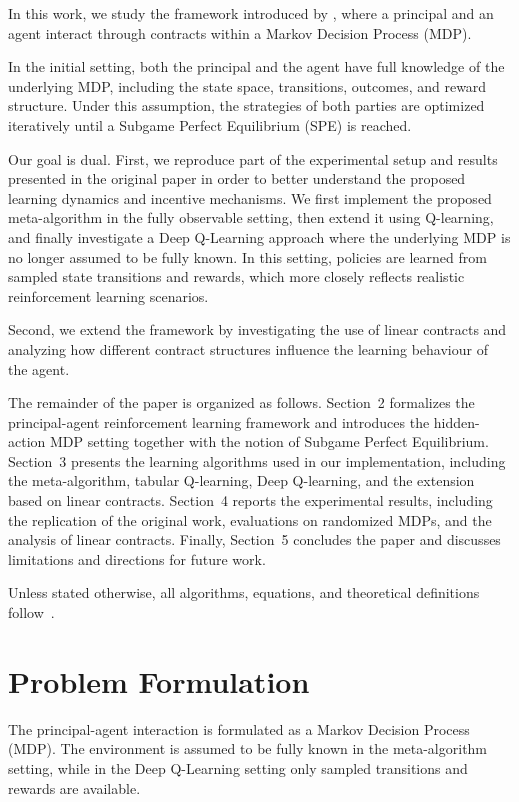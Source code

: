 \documentclass{article}
\theoremstyle{plain}
\theoremstyle{definition}
\theoremstyle{remark}
\begin{document}
In this work, we study the framework introduced by \cite{ivanov2024principal}, where a principal and an agent interact through contracts within a Markov Decision Process (MDP).

In the initial setting, both the principal and the agent have full knowledge of the underlying MDP, including the state space, transitions, outcomes, and reward structure. Under this assumption, the strategies of both parties are optimized iteratively until a Subgame Perfect Equilibrium (SPE) is reached.

Our goal is dual.
First, we reproduce part of the experimental setup and results presented in the original paper in order to better understand the proposed learning dynamics and incentive mechanisms. We first implement the proposed meta-algorithm in the fully observable setting, then extend it using Q-learning, and finally investigate a Deep Q-Learning approach where the underlying MDP is no longer assumed to be fully known. In this setting, policies are learned from sampled state transitions and rewards, which more closely reflects realistic reinforcement learning scenarios.

Second, we extend the framework by investigating the use of linear contracts and analyzing how different contract structures influence the learning behaviour of the agent.

The remainder of the paper is organized as follows.
Section~2 formalizes the principal-agent reinforcement learning framework and introduces the hidden-action MDP setting together with the notion of Subgame Perfect Equilibrium.
Section~3 presents the learning algorithms used in our implementation, including the meta-algorithm, tabular Q-learning, Deep Q-learning, and the extension based on linear contracts.
Section~4 reports the experimental results, including the replication of the original work, evaluations on randomized MDPs, and the analysis of linear contracts.
Finally, Section~5 concludes the paper and discusses limitations and directions for future work.

Unless stated otherwise, all algorithms, equations, and theoretical definitions follow~\cite{ivanov2024principal}.
\section{Problem Formulation}

The principal-agent interaction is formulated as a Markov Decision Process (MDP). The environment is assumed to be fully known in the meta-algorithm setting, while in the Deep Q-Learning setting only sampled transitions and rewards are available.
\end{document}

